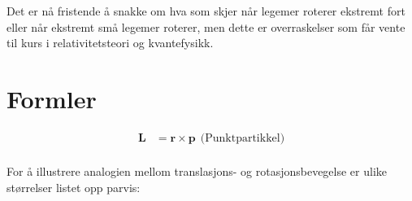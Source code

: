 \documentclass[twoside,utf8]{article}
\begin{document}
Det er nå fristende å snakke om hva som skjer når legemer roterer ekstremt fort eller når ekstremt små legemer roterer, men dette er overraskelser som får vente til kurs i relativitetsteori og kvantefysikk.






\newpage





\part*{Formler}

\begin{equation*}
\begin{align}
  \mathbf{L} & = \mathbf{r}\times \mathbf{p}  \ \     \text{(Punktpartikkel)} \\
\end{align}
\end{equation*}

For å illustrere analogien mellom translasjons- og rotasjonsbevegelse er ulike størrelser listet opp parvis:
\end{document}
